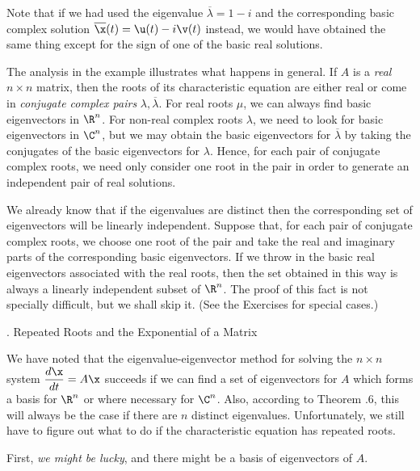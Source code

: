 Note that if we had used the eigenvalue $\overline\lambda = 1 - i$
and the corresponding basic 
complex solution $\overline\x(t) = \u(t) - i\v(t)$ instead, we would
have obtained the same thing except for the sign of
one of the basic real solutions.
\endexample

The analysis in the example illustrates what happens in general.
If $A$ is a {\it real\/} $n\times n$ matrix, then the roots of
its characteristic equation are either real or come in {\it conjugate
complex pairs\/} $\lambda, \overline\lambda$.    For real
roots $\mu$, we can always find basic eigenvectors 
in $\R^n$.
For non-real complex roots $\lambda$, we need
to look for basic eigenvectors in $\C^n$, but we may obtain the
basic eigenvectors for $\overline\lambda$ by taking the conjugates of
the basic eigenvectors for $\lambda$.  Hence, for each pair of
conjugate complex roots, we need only consider one root in the
pair in order to generate an independent pair of real solutions.

We already know that if the eigenvalues are distinct then the
corresponding set of eigenvectors will be linearly independent.
Suppose that, for each pair of conjugate complex roots,
we choose one root of the pair and take the real and imaginary
parts of the corresponding basic eigenvectors.   If we throw
in the basic real eigenvectors associated with the real
roots, then the set obtained in this way is always a linearly
independent subset of $\R^n$.   The proof of this fact is
not specially difficult, but we shall skip it.   (See the
Exercises for special cases.)
\bigskip

\bigskip

\head \sn. Repeated Roots and the Exponential of a Matrix \endhead

We have noted that the eigenvalue-eigenvector method for solving
the $n\times n$ system $\dfrac{d\x}{dt} = A\x$ succeeds
if we can find a set of eigenvectors for $A$ which forms a basis
for $\R^n$ or where necessary for $\C^n$.   Also, according to
Theorem \cn.6,
this will always be the case if there are $n$ distinct eigenvalues.
Unfortunately, we still have to figure out what to do if the
characteristic equation has repeated roots.

First, {\it we might be lucky\/}, and there might be a basis of
eigenvectors of $A$.

